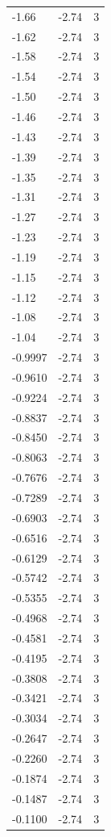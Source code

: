 \begin{longtable}{lrr}
  -1.66 & -2.74 & 3 \\
  -1.62 & -2.74 & 3 \\
  -1.58 & -2.74 & 3 \\
  -1.54 & -2.74 & 3 \\
  -1.50 & -2.74 & 3 \\
  -1.46 & -2.74 & 3 \\
  -1.43 & -2.74 & 3 \\
  -1.39 & -2.74 & 3 \\
  -1.35 & -2.74 & 3 \\
  -1.31 & -2.74 & 3 \\
  -1.27 & -2.74 & 3 \\
  -1.23 & -2.74 & 3 \\
  -1.19 & -2.74 & 3 \\
  -1.15 & -2.74 & 3 \\
  -1.12 & -2.74 & 3 \\
  -1.08 & -2.74 & 3 \\
  -1.04 & -2.74 & 3 \\
  -0.9997 & -2.74 & 3 \\
  -0.9610 & -2.74 & 3 \\
  -0.9224 & -2.74 & 3 \\
  -0.8837 & -2.74 & 3 \\
  -0.8450 & -2.74 & 3 \\
  -0.8063 & -2.74 & 3 \\
  -0.7676 & -2.74 & 3 \\
  -0.7289 & -2.74 & 3 \\
  -0.6903 & -2.74 & 3 \\
  -0.6516 & -2.74 & 3 \\
  -0.6129 & -2.74 & 3 \\
  -0.5742 & -2.74 & 3 \\
  -0.5355 & -2.74 & 3 \\
  -0.4968 & -2.74 & 3 \\
  -0.4581 & -2.74 & 3 \\
  -0.4195 & -2.74 & 3 \\
  -0.3808 & -2.74 & 3 \\
  -0.3421 & -2.74 & 3 \\
  -0.3034 & -2.74 & 3 \\
  -0.2647 & -2.74 & 3 \\
  -0.2260 & -2.74 & 3 \\
  -0.1874 & -2.74 & 3 \\
  -0.1487 & -2.74 & 3 \\
  -0.1100 & -2.74 & 3 \\

\end{longtable}
